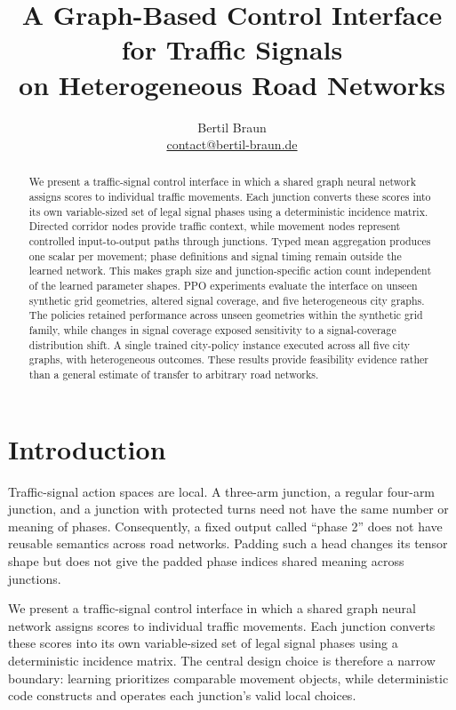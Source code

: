 \documentclass[10pt,a4paper]{article}
\title{\vspace{-1.8em}\textbf{A Graph-Based Control Interface for Traffic Signals\\on Heterogeneous Road Networks}}
\author{Bertil Braun\\{\small\href{mailto:contact@bertil-braun.de}{contact@bertil-braun.de}}}
\date{}
\begin{document}
\maketitle
\vspace{-2.2em}

\begin{abstract}
We present a traffic-signal control interface in which a shared graph neural network assigns scores to individual traffic movements.
Each junction converts these scores into its own variable-sized set of legal signal phases using a deterministic incidence matrix.
Directed corridor nodes provide traffic context, while movement nodes represent controlled input-to-output paths through junctions.
Typed mean aggregation produces one scalar per movement; phase definitions and signal timing remain outside the learned network.
This makes graph size and junction-specific action count independent of the learned parameter shapes.
PPO experiments evaluate the interface on unseen synthetic grid geometries, altered signal coverage, and five heterogeneous city graphs.
The policies retained performance across unseen geometries within the synthetic grid family, while changes in signal coverage exposed sensitivity to a signal-coverage distribution shift.
A single trained city-policy instance executed across all five city graphs, with heterogeneous outcomes.
These results provide feasibility evidence rather than a general estimate of transfer to arbitrary road networks.
\end{abstract}
\small

\section{Introduction}

Traffic-signal action spaces are local.
A three-arm junction, a regular four-arm junction, and a junction with protected turns need not have the same number or meaning of phases.
Consequently, a fixed output called ``phase 2'' does not have reusable semantics across road networks.
Padding such a head changes its tensor shape but does not give the padded phase indices shared meaning across junctions.

We present a traffic-signal control interface in which a shared graph neural network assigns scores to individual traffic movements.
Each junction converts these scores into its own variable-sized set of legal signal phases using a deterministic incidence matrix.
The central design choice is therefore a narrow boundary: learning prioritizes comparable movement objects, while deterministic code constructs and operates each junction's valid local choices.
\end{document}
